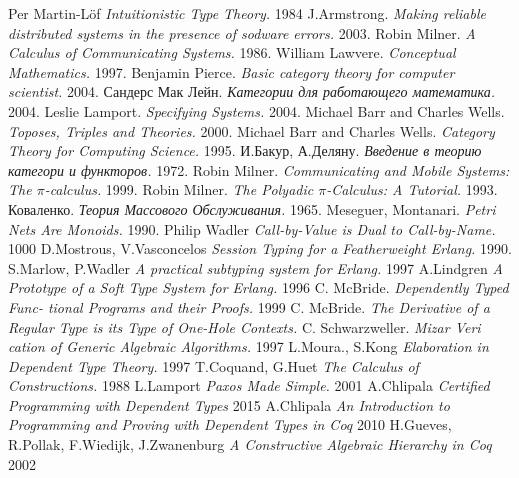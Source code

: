 \documentclass[11pt,oneside]{article}
\begin{document}
\newpage
\begin{thebibliography}{9}

      Per Martin-Löf \textit{Intuitionistic Type Theory.} 1984
      J.Armstrong. \textit{Making reliable distributed systems in the presence of sodware errors.} 2003.
     Robin Milner. \textit{ A Calculus of Communicating Systems.} 1986.
  William Lawvere. \textit{Conceptual Mathematics.} 1997.
   Benjamin Pierce. \textit{Basic category theory for computer scientist.} 2004.
   Сандерс Мак Лейн. \textit{Категории для работающего математика.} 2004.
      Leslie Lamport. \textit{Specifying Systems.} 2004.
  Michael Barr and Charles Wells. \textit{Toposes, Triples and Theories.} 2000.
  Michael Barr and Charles Wells. \textit{Category Theory for Computing Science.} 1995.
    И.Бакур, А.Деляну. \textit{Введение в теорию категори и функторов.} 1972.
   Robin Milner. \textit{Communicating and Mobile Systems: The $\pi$-calculus.} 1999.
   Robin Milner. \textit{The Polyadic $\pi$-Calculus: A Tutorial.} 1993.
     Коваленко. \textit{Теория Массового Обслуживания.} 1965.
 Meseguer, Montanari.  \textit{Petri Nets Are Monoids.} 1990.
  Philip Wadler \textit{Call-by-Value is Dual to Call-by-Name.} 1000
   D.Mostrous, V.Vasconcelos \textit{Session Typing for a Featherweight Erlang.} 1990.
   S.Marlow, P.Wadler \textit{A practical subtyping system for Erlang.} 1997
   A.Lindgren \textit{A Prototype of a Soft Type System for Erlang.} 1996
  C. McBride. \textit{Dependently Typed Func- tional Programs and their Proofs.} 1999
 C. McBride. \textit{The Derivative of a Regular Type is its Type of One-Hole Contexts.}
  C. Schwarzweller. \textit{Mizar Veri cation of Generic Algebraic Algorithms.} 1997
  L.Moura., S.Kong \textit{Elaboration in Dependent Type Theory.} 1997
  T.Coquand, G.Huet \textit{The Calculus of Constructions.} 1988
   L.Lamport \textit{Paxos Made Simple.} 2001
   A.Chlipala \textit{Certified Programming with Dependent Types} 2015
 A.Chlipala \textit{An Introduction to Programming and Proving with Dependent Types in Coq} 2010
   H.Gueves, R.Pollak, F.Wiedijk, J.Zwanenburg \textit{A Constructive Algebraic Hierarchy in Coq} 2002

\end{thebibliography}
\end{document}
